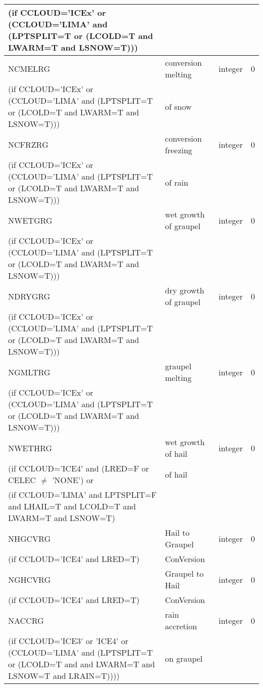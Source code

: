 \begin{longtable} {|p{}|p{}|>{\centering}p{}|p{}<{\centering}|}
(if CCLOUD='ICEx' or (CCLOUD='LIMA' and (LPTSPLIT=T or (LCOLD=T and LWARM=T and LSNOW=T))) & & & \\\hline
NCMELRG  & conversion melting & integer  &  0 \index{NCMELRG!\innam{NAM\_BU\_RRG}}\\ \nopagebreak
(if CCLOUD='ICEx' or (CCLOUD='LIMA' and (LPTSPLIT=T or (LCOLD=T and LWARM=T and LSNOW=T))) & of snow & & \\\hline
NCFRZRG  & conversion freezing & integer  &  0 \index{NCFRZRG!\innam{NAM\_BU\_RRG}}\\ \nopagebreak
(if CCLOUD='ICEx' or (CCLOUD='LIMA' and (LPTSPLIT=T or (LCOLD=T and LWARM=T and LSNOW=T))) & of rain & & \\\hline
NWETGRG  & wet growth of graupel  & integer  &  0 \index{NWETGRG!\innam{NAM\_BU\_RRG}}\\ \nopagebreak
(if CCLOUD='ICEx' or (CCLOUD='LIMA' and (LPTSPLIT=T or (LCOLD=T and LWARM=T and LSNOW=T))) & & & \\\hline
NDRYGRG  & dry growth of graupel  & integer  &  0 \index{NDRYGRG!\innam{NAM\_BU\_RRG}}\\ \nopagebreak
(if CCLOUD='ICEx' or (CCLOUD='LIMA' and (LPTSPLIT=T or (LCOLD=T and LWARM=T and LSNOW=T))) & & & \\\hline
NGMLTRG  & graupel melting  & integer  &  0 \index{NGMLTRG!\innam{NAM\_BU\_RRG}}\\ \nopagebreak
(if CCLOUD='ICEx' or (CCLOUD='LIMA' and (LPTSPLIT=T or (LCOLD=T and LWARM=T and LSNOW=T))) & & & \\\hline
NWETHRG  & wet growth of hail & integer  &  0 \index{NWETHRG!\innam{NAM\_BU\_RRG}}\\ \nopagebreak
(if CCLOUD='ICE4' and (LRED=F or CELEC $\neq$ 'NONE') or &of hail &   &  \\
(if CCLOUD='LIMA' and LPTSPLIT=F and LHAIL=T and LCOLD=T and LWARM=T and LSNOW=T) & &   &  \\\hline
NHGCVRG  & Hail to Graupel  & integer  &  0 \index{NHGCVRG!\innam{NAM\_BU\_RRG}}\\ \nopagebreak
(if CCLOUD='ICE4' and LRED=T) & ConVersion  &   &  \\\hline
NGHCVRG  & Graupel to Hail  & integer  &  0 \index{NGHCVRG!\innam{NAM\_BU\_RRG}}\\ \nopagebreak
(if CCLOUD='ICE4' and LRED=T) & ConVersion  &   &  \\\hline
NACCRG  & rain accretion & integer  &  0 \index{NACCRG!\innam{NAM\_BU\_RRG}}\\ \nopagebreak
(if CCLOUD='ICE3' or 'ICE4' or (CCLOUD='LIMA' and (LPTSPLIT=T or (LCOLD=T and and LWARM=T and LSNOW=T and LRAIN=T)))) & on graupel &   &  \\\hline

\end{longtable}

